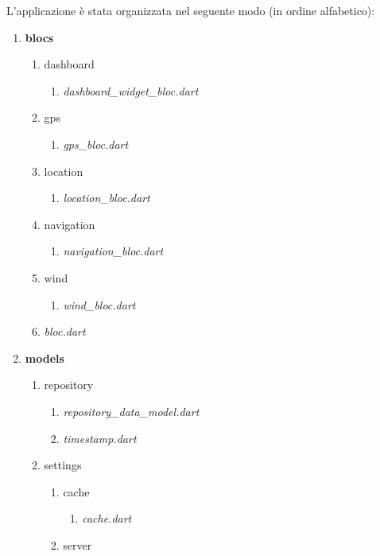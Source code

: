 L'applicazione è stata organizzata nel seguente modo (in ordine alfabetico):
\begin{enumerate}
	\item \textbf{blocs}
		\begin{enumerate}
			\item dashboard
				\begin{enumerate}
					\item \textit{dashboard\_widget\_bloc.dart}
				\end{enumerate}
			\item gps
				\begin{enumerate}
					\item \textit{gps\_bloc.dart}
				\end{enumerate}
			\item location
				\begin{enumerate}
					\item \textit{location\_bloc.dart}
				\end{enumerate}
			\item navigation
				\begin{enumerate}
					\item \textit{navigation\_bloc.dart}
				\end{enumerate}
			\item wind
				\begin{enumerate}
					\item \textit{wind\_bloc.dart}
				\end{enumerate}
			\item \textit{bloc.dart}
		\end{enumerate}
	\item \textbf{models}
		\begin{enumerate}
			\item repository
				\begin{enumerate}
					\item \textit{repository\_data\_model.dart}
					\item \textit{timestamp.dart}
				\end{enumerate}
			\item settings
				\begin{enumerate}
					\item cache
						\begin{enumerate}
							\item \textit{cache.dart}
						\end{enumerate}
					\item server
						\begin{enumerate}

\end{enumerate}
\end{enumerate}
\end{enumerate}
\end{enumerate}
